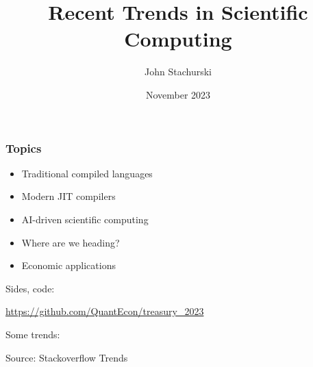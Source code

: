 \documentclass[
    xcolor={svgnames,dvipsnames},
    hyperref={colorlinks, citecolor=DeepPink4, linkcolor=DarkRed, urlcolor=DarkBlue}
    ]{beamer}  %
\title{Recent Trends in Scientific Computing}
\author{John Stachurski}
\date{November 2023}
\newcommand{\1}{\mathbbm 1}
\begin{document}
\begin{frame}
  \titlepage
\end{frame}







\begin{frame}
    \frametitle{Topics}

    \begin{itemize}
        \item Traditional compiled languages
        \vspace{0.5em}
        \item Modern JIT compilers
        \vspace{0.5em}
        \item AI-driven scientific computing
        \vspace{0.5em}
        \item Where are we heading?
        \vspace{0.5em}
        \item Economic applications
    \end{itemize}

\end{frame}


\begin{frame}
    
    Sides, code:

    \url{https://github.com/QuantEcon/treasury_2023}

\end{frame}


\begin{frame}

    Some trends: 

    \begin{figure}
       \begin{center}
       \end{center}
    \end{figure}

    Source: Stackoverflow Trends

\end{frame}
\end{document}
